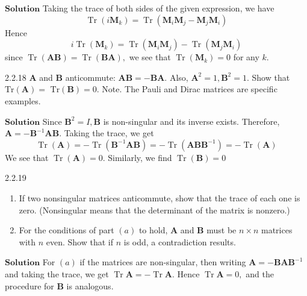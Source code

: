 \documentclass{article}
\begin{document}
\begin{flushleft}
$\boxed{\textbf{Solution}}$  Taking the trace of both sides of the given expression, we have
$$
\operatorname{Tr}\left(i \mathbf{M}_{k}\right)=\operatorname{Tr}\left(\mathbf{M}_{i} \mathbf{M}_{j}-\mathbf{M}_{j} \mathbf{M}_{i}\right)
$$
Hence
$$
i \operatorname{Tr}\left(\mathbf{M}_{k}\right)=\operatorname{Tr}\left(\mathbf{M}_{i} \mathbf{M}_{j}\right)-\operatorname{Tr}\left(\mathbf{M}_{j} \mathbf{M}_{i}\right)
$$
since $\operatorname{Tr}(\mathbf{A}\mathbf{B})=\operatorname{Tr}(\mathbf{B}\mathbf{A}),$ we see that $\operatorname{Tr}\left(\mathbf{M}_{k}\right)=0$ for any $k .$



\newpage

\begin{mybox}{2.2.18}
$\mathbf{A}$ and $\mathbf{B}$ anticommute: $\mathbf{A}\mathbf{B}=-\mathbf{B}\mathbf{A}$. Also, $\mathbf{A}^{2}=1, \mathbf{B}^{2}=1 .$ Show that $\text{Tr}(\mathbf{A})=$
$\text{Tr}(\mathbf{B})=0 .$
Note. The Pauli and Dirac matrices are specific examples.
\end{mybox}



$\boxed{\textbf{Solution}}$ Since $\mathbf{B}^{2}=I, \mathbf{B}$ is non-singular and its inverse exists. Therefore, $\mathbf{A}=-\mathbf{B}^{-1} \mathbf{AB}$. Taking the trace, we get
$$
\operatorname{Tr}(\mathbf{A})=-\operatorname{Tr}\left(\mathbf{B}^{-1} \mathbf{AB}\right)=-\operatorname{Tr}\left(\mathbf{ABB}^{-1}\right)=-\operatorname{Tr}(\mathbf{A})
$$
We see that $\operatorname{Tr}(\mathbf{A})=0 .$ Similarly, we find $\operatorname{Tr}(\mathbf{B})=0$


\newpage




\begin{mybox}{2.2.19}
\begin{enumerate}[$(a)$]
\item If two nonsingular matrices anticommute, show that the trace of each one is zero.
(Nonsingular means that the determinant of the matrix is nonzero.)
\item For the conditions of part $(a)$ to hold, $\mathbf{A}$ and $\mathbf{B}$ must be $n \times n$ matrices with $n$ even.
Show that if $n$ is odd, a contradiction results.
\end{enumerate}
\end{mybox}

$\boxed{\textbf{Solution}}$ For $(a)$ if the matrices are non-singular, then writing $\mathbf{A}=-\mathbf{B} \mathbf{A} \mathbf{B}^{-1}$ and taking the trace, we get $\operatorname{Tr} \mathbf{A}=-\operatorname{Tr} \mathbf{A} .$ Hence $\operatorname{Tr} \mathbf{A}=0,$ and the procedure for $\mathbf{B}$ is analogous.



\end{flushleft}
\end{document}
